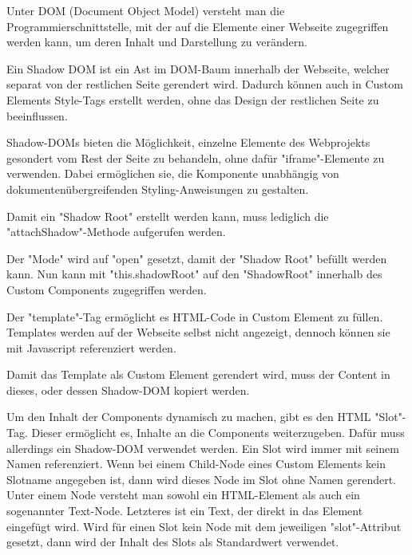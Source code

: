 \pagebreak
{}

Unter DOM (Document Object Model) versteht man die Programmierschnittstelle, mit der auf die Elemente einer Webseite zugegriffen werden kann, um deren Inhalt und Darstellung zu verändern. \cite{MDNDOM}

Ein Shadow DOM ist ein Ast im DOM-Baum innerhalb der Webseite, welcher separat von der restlichen Seite gerendert wird.
Dadurch können auch in Custom Elements Style-Tags erstellt werden, ohne das Design der restlichen Seite zu beeinflussen. \cite{MDNShadowRoot}

Shadow-DOMs bieten die Möglichkeit, einzelne Elemente des Webprojekts gesondert vom Rest der Seite zu behandeln, ohne dafür "{\ttfamily iframe}"-Elemente zu verwenden. 
Dabei ermöglichen sie, die Komponente unabhängig von dokumentenübergreifenden Styling-Anweisungen zu gestalten. \cite{IONOSShadowDom}

Damit ein "Shadow Root" erstellt werden kann, muss lediglich die "{\ttfamily attachShadow}"-Methode aufgerufen werden. \cite{MDNShadowRoot}


Der "Mode" wird auf "{\ttfamily open}" gesetzt, damit der "Shadow Root" befüllt werden kann. Nun kann mit "{\ttfamily this.shadowRoot}" auf den "ShadowRoot" innerhalb des Custom Components zugegriffen werden.
\cite{MDNShadowRoot}

\pagebreak
{}

Der "template"-Tag ermöglicht es HTML-Code in Custom Element zu füllen.
Templates werden auf der Webseite selbst nicht angezeigt, dennoch können sie mit Javascript referenziert werden. \cite{MDNtemplate}


Damit das Template als Custom Element gerendert wird, muss der Content in dieses, oder dessen Shadow-DOM kopiert werden.



Um den Inhalt der Components dynamisch zu machen, gibt es den HTML "Slot"-Tag. 
Dieser ermöglicht es, Inhalte an die Components weiterzugeben. 
Dafür muss allerdings ein Shadow-DOM verwendet werden. 
Ein Slot wird immer mit seinem Namen referenziert. 
Wenn bei einem Child-Node eines Custom Elements kein Slotname angegeben ist, dann wird dieses Node im Slot ohne Namen gerendert. 
Unter einem Node versteht man sowohl ein HTML-Element als auch ein sogenannter Text-Node. 
Letzteres ist ein Text, der direkt in das Element eingefügt wird. 
Wird für einen Slot kein Node mit dem jeweiligen "{\ttfamily slot}"-Attribut gesetzt, dann wird der Inhalt des Slots als Standardwert verwendet. 
\cite{MDNSlots}

